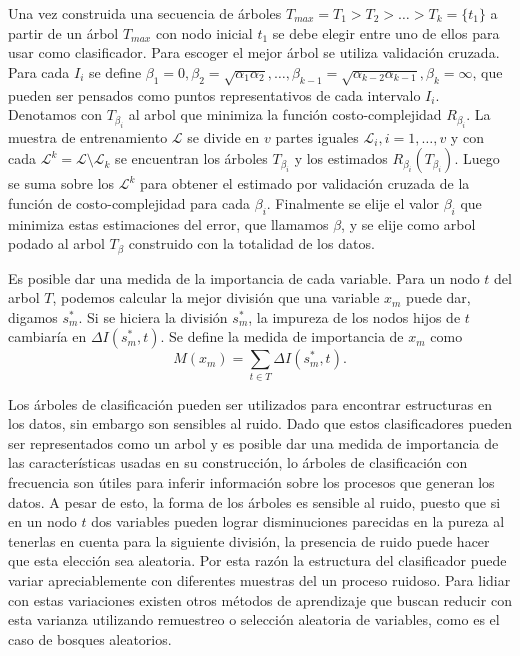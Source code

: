 \documentclass[letterpaper,12pt]{book}
\begin{document}
Una vez construida una secuencia de árboles $T_{max} = T_1>T_2>\dots>T_{k}=\{t_1\}$  a partir de un árbol $T_{max}$ con nodo inicial $t_1$ se debe elegir entre uno de ellos para usar como clasificador. Para escoger el mejor árbol se utiliza validación cruzada.  Para cada $I_i$ se define $\beta_1 = 0, \beta_2 = \sqrt{\alpha_1\alpha_2},\dots, \beta_{k-1} = \sqrt{\alpha_{k-2}\alpha_{k-1}},\beta_{k} = \infty$, que pueden ser pensados como puntos representativos de cada intervalo $I_i$. Denotamos con $T_{\beta_{i}}$ al arbol que minimiza la función costo-complejidad $R_{\beta_i}$.  La muestra de entrenamiento $\mathcal{L}$ se divide en $v$ partes iguales $\mathcal{L}_i,i=1,\dots,v$ y con cada $\mathcal{L}^k = \mathcal{L}\setminus \mathcal{L}_k$ se encuentran los árboles $T_{\beta_i}$ y los estimados $R_{\beta_i}(T_{\beta_i})$. Luego se suma sobre los $\mathcal{L}^k$ para obtener el estimado por validación cruzada de la función de costo-complejidad para cada $\beta_{i}$. Finalmente se elije el valor $\beta_i$ que minimiza estas estimaciones del error, que llamamos $\beta$, y se elije como arbol podado al  arbol $T_{\beta}$ construido con la totalidad de los datos.

Es posible dar una medida de la importancia de cada variable. Para un nodo $t$ del arbol $T$, podemos calcular la mejor división que una variable $x_m$ puede dar, digamos $s_m^*$. Si se hiciera la división $s_m^*$, la impureza de los nodos hijos de $t$ cambiaría en $\Delta I(s^*_m,t)$. Se define la medida de importancia de $x_m$ como 
\begin{equation}
M(x_m) =\sum_{t\in T} \Delta I(s^*_m,t).
\end{equation} 
 
Los árboles de clasificación pueden ser utilizados para encontrar estructuras en los datos, sin embargo son sensibles al ruido. Dado que estos clasificadores pueden ser representados como un arbol y es posible dar una medida de importancia de las características usadas en su construcción, lo árboles de clasificación con frecuencia son útiles para inferir información sobre los procesos que generan los datos. A pesar de esto, la forma de los árboles es sensible al ruido, puesto que si en un nodo $t$ dos variables pueden lograr disminuciones parecidas en la pureza al tenerlas en cuenta para la siguiente división, la presencia de ruido puede hacer que esta elección sea aleatoria. Por esta razón la estructura del clasificador puede variar apreciablemente con diferentes muestras del un proceso ruidoso. Para lidiar con estas variaciones existen otros métodos de aprendizaje que buscan reducir con esta varianza utilizando remuestreo o selección aleatoria de variables, como es el caso de bosques aleatorios.
\end{document}
